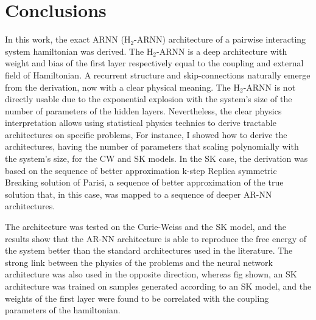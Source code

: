 \documentclass[aps,physrev,10pt,floatfix,reprint]{revtex4-2}
\begin{document}
\section{Conclusions}
In this work, the exact ARNN (H$_2$-ARNN) architecture of a pairwise interacting system hamiltonian was derived. The H$_2$-ARNN is a deep architecture with weight and bias of the first layer respectively equal to the coupling and external field of Hamiltonian. A recurrent structure and skip-connections naturally emerge from the derivation, now with a clear physical meaning. The H$_2$-ARNN is not directly usable due to the exponential explosion with the system's size of the number of parameters of the hidden layers. Nevertheless, the clear physics interpretation allows using statistical physics technics to derive tractable architectures on specific problems, For instance, I showed how to derive the architectures, having the number of parameters that scaling polynomially with the system's size, for the CW and SK models. In the SK case, the derivation was based on the sequence of better approximation k-step Replica symmetric Breaking solution of Parisi, a sequence of better approximation of the true solution that, in this case, was mapped to a sequence of deeper AR-NN architectures. 

The architecture was tested on the Curie-Weiss and the SK model, and the results show that the AR-NN architecture is able to reproduce the free energy of the system better than the standard architectures used in the literature. 
The strong link between the physics of the problems and the neural network architecture was also used in the opposite direction, whereas fig shown, an SK architecture was trained on samples generated according to an SK model, and the weights of the first layer were found to be correlated with the coupling parameters of the hamiltonian.
\end{document}
